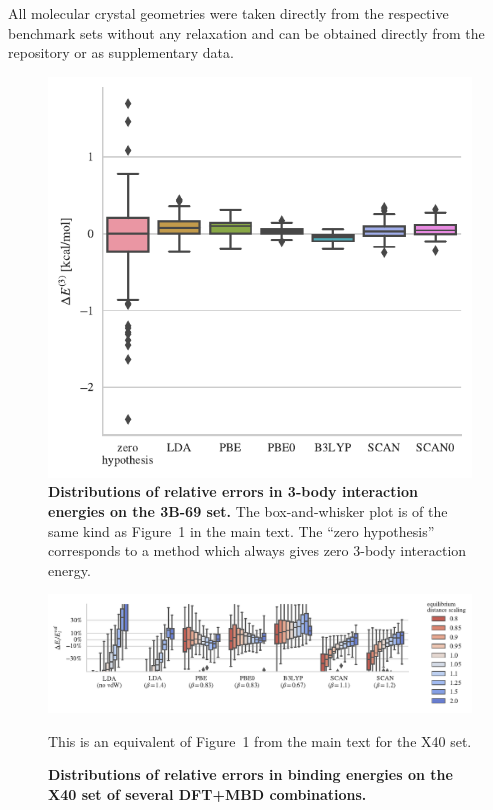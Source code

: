 \documentclass[twocolumn]{article}
\begin{document}
All molecular crystal geometries were taken directly from the respective benchmark sets without any relaxation and can be obtained directly from the repository or as supplementary data.

\begin{figure}
\includegraphics[center]{media/3-body}
\caption{\textbf{Distributions of relative errors in 3-body interaction energies on the 3B-69 set.}
The box-and-whisker plot is of the same kind as Figure~1 in the main text.
The ``zero hypothesis'' corresponds to a method which always gives zero 3-body interaction energy.
}\label{fig:3-body}
\end{figure}

\begin{figure}
\includegraphics[center]{media/x40-dists}
\caption{\textbf{Distributions of relative errors in binding energies on the  X40 set of several DFT+MBD combinations.}
}\label{fig:x40-dists}
This is an equivalent of Figure~1 from the main text for the X40 set.
\end{figure}
\end{document}
